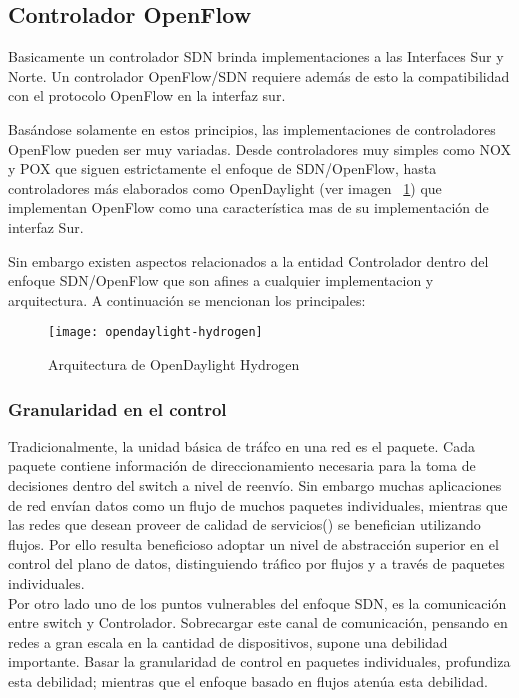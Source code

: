 \subsection{Controlador OpenFlow}
Basicamente un controlador SDN brinda implementaciones a las Interfaces Sur y Norte. Un controlador OpenFlow/SDN requiere adem\'as de esto la compatibilidad con el protocolo OpenFlow en la interfaz sur. 

Basándose solamente en estos principios, las implementaciones de controladores OpenFlow pueden ser muy variadas. Desde controladores muy simples como NOX\cite{ControllersNOX} y POX\cite{ControllersPOX} que siguen estrictamente el enfoque de SDN/OpenFlow, hasta controladores m\'as elaborados como OpenDaylight\cite{ControllersOpendaylight} (ver imagen ~\ref{fig:OpenDayLightHydrogen}) que implementan OpenFlow como una característica mas de su implementaci\'on de interfaz Sur.

Sin embargo existen aspectos relacionados a la entidad Controlador dentro del enfoque SDN/OpenFlow que son afines a cualquier implementacion y arquitectura. A continuaci\'on se mencionan los principales:
  
\begin{figure}[ht!] 
\centering    
\texttt{[image: opendaylight-hydrogen]}
\caption[Arquitectura de OpenDaylight Hydrogen]{Arquitectura de OpenDaylight Hydrogen}
\label{fig:OpenDayLightHydrogen}
\end{figure}

\subsubsection{Granularidad en el control}
Tradicionalmente, la unidad básica de tráfco en una red es el paquete. Cada paquete contiene información de direccionamiento necesaria para la toma de decisiones dentro del switch a nivel de reenvío. Sin embargo muchas aplicaciones de red envían datos como un flujo de muchos paquetes individuales, mientras que las redes que desean proveer de calidad de servicios() se benefician utilizando flujos. Por ello resulta beneficioso adoptar un nivel de abstracción superior en el control del plano de datos, distinguiendo tr\'afico por flujos y a través de paquetes individuales.\\
 
Por otro lado uno de los puntos vulnerables del enfoque SDN, es la comunicación entre switch y Controlador. Sobrecargar este canal de comunicación, pensando en redes a gran escala en la cantidad de dispositivos, supone una debilidad importante. Basar la granularidad de control en paquetes individuales, profundiza esta debilidad; mientras que el enfoque basado en flujos atenúa esta debilidad. 

